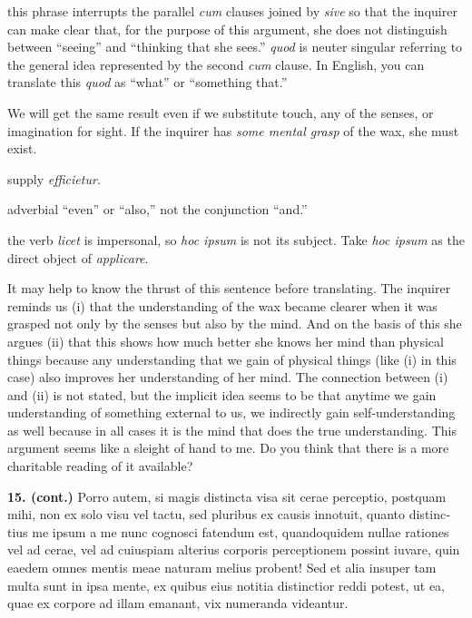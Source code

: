  this phrase interrupts the parallel \textit{cum} clauses joined by \textit{sive} so that the inquirer can make clear that, for the purpose of this argument, she does not distinguish between ``seeing'' and ``thinking that she sees.'' \textit{quod} is neuter singular referring to the general idea represented by the second \textit{cum} clause. In English, you can translate this \textit{quod} as ``what'' or ``something that.''

 We will get the same result even if we substitute touch, any of the senses, or imagination for sight. If the inquirer has \textit{some mental grasp} of the wax, she must exist.

 supply \textit{efficietur}.

 adverbial ``even'' or ``also,'' not the conjunction ``and.''

 the verb \textit{licet} is impersonal, so \textit{hoc ipsum} is not its subject. Take \textit{hoc ipsum} as the direct object of \textit{applicare}.

 It may help to know the thrust of this sentence before translating. The inquirer reminds us (i) that the understanding of the wax became clearer when it was grasped not only by the senses but also by the mind. And on the basis of this she argues (ii) that this shows how much better she knows her mind than physical things because any understanding that we gain of physical things (like (i) in this case) also improves her understanding of her mind. The connection between (i) and (ii) is not stated, but the implicit idea seems to be that anytime we gain understanding of something external to us, we indirectly gain self-understanding as well because in all cases it is the mind that does the true understanding. This argument seems like a sleight of hand to me. Do you think that there is a more charitable reading of it available?

\clearpage

\beginnumbering
{}
\pstart
\begin{latin}
    \textenglish{\textbf{15. (cont.)}} Porro autem, si magis distincta visa sit cerae perceptio, postquam mihi, non ex solo visu vel tactu, sed pluribus ex causis innotuit, quanto distinctius me ipsum a me nunc cognosci fatendum est, quandoquidem nullae rationes vel ad cerae, vel ad cuiuspiam alterius corporis perceptionem possint iuvare, quin eaedem omnes mentis meae naturam melius probent! Sed et alia insuper tam multa sunt in ipsa mente, ex quibus eius notitia distinctior reddi potest, ut ea, quae ex corpore ad illam emanant, vix numeranda videantur.
\end{latin}
\pend
\endnumbering

